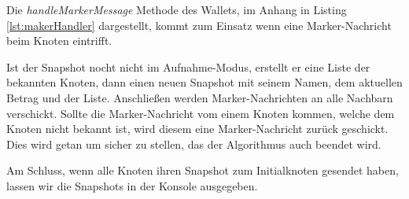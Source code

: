 Die \textit{handleMarkerMessage} Methode des Wallets, im Anhang in Listing 
\ref{lst:makerHandler} dargestellt, kommt zum Einsatz wenn eine Marker-Nachricht
beim Knoten eintrifft.

Ist der Snapshot nocht nicht im Aufnahme-Modus, erstellt er eine Liste der
bekannten Knoten, dann einen neuen Snapshot mit seinem Namen, dem aktuellen
Betrag und der Liste. Anschließen werden Marker-Nachrichten an alle Nachbarn
verschickt.
Sollte die Marker-Nachricht vom einem Knoten kommen, welche dem Knoten nicht
bekannt ist, wird diesem eine Marker-Nachricht zurück geschickt.
Dies wird getan um sicher zu stellen, das der Algorithmus auch beendet wird.

Am Schluss, wenn alle Knoten ihren Snapshot zum Initialknoten gesendet haben,
lassen wir die Snapshots in der Konsole ausgegeben.
